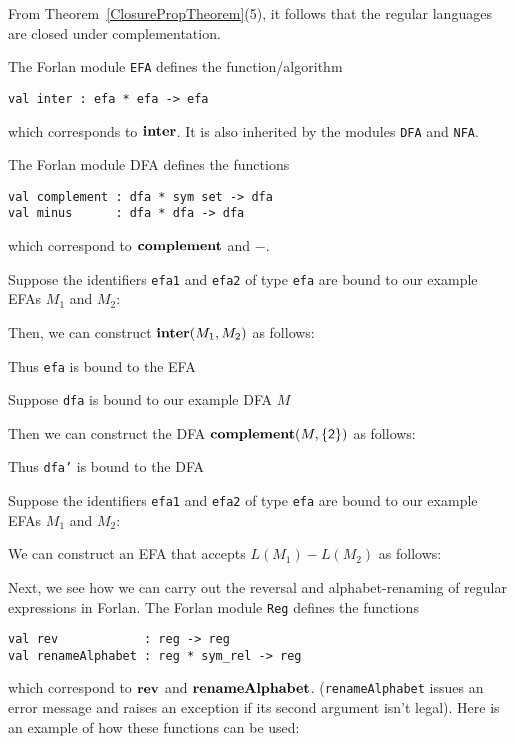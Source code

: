 From Theorem~\ref{ClosurePropTheorem}(5), it follows that the
regular languages are closed under complementation.
%
%

The Forlan module \texttt{EFA} defines the function/algorithm
\begin{verbatim}
val inter : efa * efa -> efa
\end{verbatim}
which corresponds to $\mathbf{inter}$.  It is also inherited by the
modules \texttt{DFA} and \texttt{NFA}.

The Forlan module DFA defines the functions
\begin{verbatim}
val complement : dfa * sym set -> dfa
val minus      : dfa * dfa -> dfa
\end{verbatim}
which correspond to $\mathbf{complement}$ and $\minus$.

Suppose the identifiers \texttt{efa1} and \texttt{efa2} of type \texttt{efa}
are bound to our example EFAs $M_1$ and $M_2$:
\begin{center}

\end{center}
Then, we can construct $\mathbf{inter}(M_1,M_2)$ as follows:

Thus \texttt{efa} is bound to the EFA
\begin{center}

\end{center}

Suppose \texttt{dfa} is bound to our example DFA $M$
\begin{center}

\end{center}
Then we can construct the DFA $\mathbf{complement}(M,\{\mathsf{2}\})$
as follows:

Thus \texttt{dfa'} is bound to the DFA
\begin{center}

\end{center}

Suppose the identifiers \texttt{efa1} and \texttt{efa2} of type \texttt{efa}
are bound to our example EFAs $M_1$ and $M_2$:
\begin{center}

\end{center}
We can construct an EFA that accepts $L(M_1)-L(M_2)$ as follows:


Next, we see how we can carry out the reversal and alphabet-renaming
of regular expressions in Forlan.  The Forlan module \texttt{Reg}
defines the functions
\begin{verbatim}
val rev            : reg -> reg
val renameAlphabet : reg * sym_rel -> reg
\end{verbatim}
%
%
which correspond to $\mathbf{rev}$ and $\mathbf{renameAlphabet}$.
(\texttt{renameAlphabet} issues an error message and raises
an exception if its second argument isn't legal).
Here is an example of how these functions can be used:


